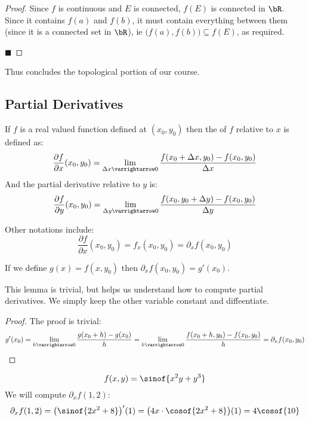\documentclass[10pt]{article}
\def\pdv#1#2{\frac{\partial #1}{\partial #2}}
\begin{document}
\begin{proof}

    Since $f$ is continuous and $E$ is connected, $f(E)$ is connected in $\bR$.
    Since it contains $f(a)$ and $f(b)$, it must contain everything between them (since it is a connected set in $\bR$), ie $\bigl(f(a), f(b)\bigr)\subseteq f(E)$, as required.

    \hfill$\blacksquare$

\end{proof}

Thus concludes the topological portion of our course.

\newpage
\subsection{Partial Derivatives}

\begin{defn*}

    If $f$ is a real valued function defined at $(x_0,y_0)$ then the  of $f$ relative to $x$ is defined as:
    \[ \pdv fx(x_0,y_0) = \lim_{\Delta x\varrightarrow0}\frac{f(x_0+\Delta x, y_0) - f(x_0, y_0)}{\Delta x} \]
    And the partial derivative relative to $y$ is:
    \[ \pdv fy(x_0,y_0) = \lim_{\Delta y\varrightarrow0}\frac{f(x_0,y_0+\Delta y)-f(x_0,y_0)}{\Delta y} \]

    Other notations include:
    \[ \pdv fx(x_0,y_0) = f_x(x_0,y_0) = \partial_x f(x_0,y_0) \]

\end{defn*}

\begin{lemm*}

    If we define $g(x)=f(x,y_0)$ then $\partial_x f(x_0,y_0)=g'(x_0)$.

\end{lemm*}

This lemma is trivial, but helps us understand how to compute partial derivatives.
We simply keep the other variable constant and diffeentiate.

\begin{proof}

    The proof is trivial:
    \[ g'(x_0) = \lim_{h\varrightarrow0}\frac{g(x_0+h) - g(x_0)}h = \lim_{h\varrightarrow0}\frac{f(x_0+h,y_0)-f(x_0,y_0)}h = \partial_x f(x_0, y_0) \]

\end{proof}

\begin{exam}

    \[ f(x,y) = \sinof{x^2y + y^3} \]
    We will compute $\partial_x f(1,2)$:
    \[ \partial_x f(1,2) = \bigl(\sinof{2x^2+8}\bigr)'(1) = \bigl(4x\cdot\cosof{2x^2 + 8}\bigr)(1) = 4\cosof{10} \]

\end{exam}
\end{document}
